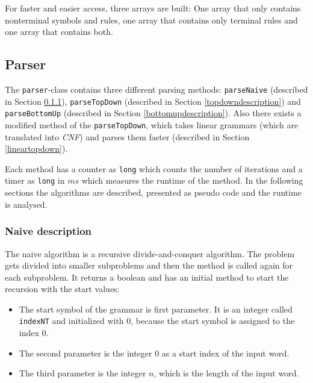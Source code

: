 \documentclass[a4paper, 11pt]{article}
\begin{document}
For faster and easier access, three arrays are built: One array that only contains nonterminal symbols and rules, one array that contains only terminal rules and one array that contains both.









\subsection{Parser}
\label{parser}

The \texttt{parser}-class contains three different parsing methods: \texttt{parseNaive} (described in Section \ref{naivedescription}), \texttt{parseTopDown} (described in Section \ref{topdowndescription}) and \texttt{parseBottomUp} (described in Section \ref{bottomupdescription}). Also there exists a modified method of the \texttt{parseTopDown}, which takes linear grammars (which are translated into \textit{CNF}) and parses them faster (described in Section \ref{lineartopdown}).

Each method has a counter as \texttt{long} which counts the number of iterations and a timer as \texttt{long} in $ms$ which measures the runtime of the method. In the following sections the algorithms are described, presented as pseudo code and the runtime is analysed.


\subsubsection{Naive description}
\label{naivedescription}


The naive algorithm is a recursive divide-and-conquer algorithm. The problem gets divided into smaller subproblems and then the method is called again for each subproblem. It returns a boolean and has an initial method to start the recursion with the start values:
\begin{itemize}
\item The start symbol of the grammar is first parameter. It is an integer called \texttt{indexNT} and initialized with 0, because the start symbol is assigned to the index 0.
\item The second parameter is the integer 0 as a start index of the input word.
\item The third parameter is the integer $n$, which is the length of the input word.
\end{itemize} 
\end{document}
